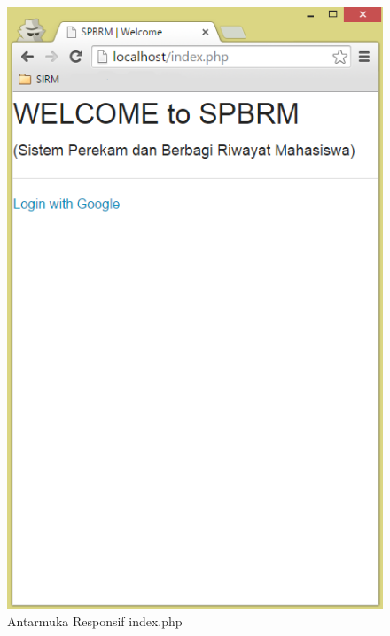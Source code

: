 \begin{figure}[H]
\centering
\includegraphics[scale=0.44]{Gambar/pengujian22.png}
\caption[Antarmuka Responsif index.php]{Antarmuka Responsif index.php} 
\label{fig:responsifindex}
\end{figure}

